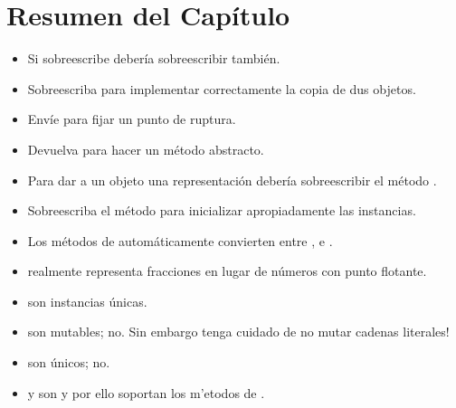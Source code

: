 \documentclass[a4paper,10pt,twoside]{book}
\begin{document}

\section{Resumen del Cap\'itulo}

\begin{itemize}

  \item Si sobreescribe \ct{=} deber\'ia sobreescribir  tambi\'en.

  \item Sobreescriba  para implementar correctamente la copia de dus objetos.

  \item Env\'ie  para fijar un punto de ruptura.

  \item Devuelva  para hacer un m\'etodo abstracto.

  \item Para dar a un objeto una representaci\'on  deber\'ia sobreescribir el m\'etodo .

  \item Sobreescriba el m\'etodo  para inicializar apropiadamente las instancias.

  \item Los m\'etodos de  autom\'aticamente convierten entre  ,  e .

  \item {} realmente representa fracciones en lugar de n\'umeros con punto flotante.

  \item {} son instancias \'unicas.

  \item {} son mutables;  no.
  Sin embargo tenga cuidado de no mutar cadenas literales!

  \item {} son \'unicos;  no.

  \item {} y  son  y por ello soportan los m'etodos de .

\end{itemize}
\ifx\wholebook\relax\else
   
   
\end{document}
